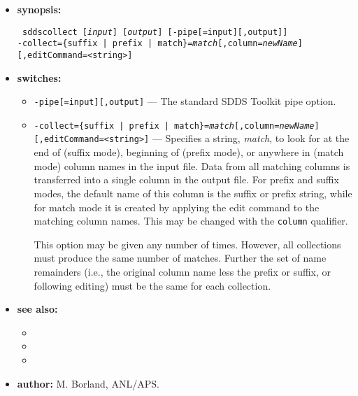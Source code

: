 \begin{itemize}
\item {\bf synopsis:}  
 
\begin{flushleft}{\tt 
sddscollect [{\em input}] [{\em output}] [-pipe[=input][,output]] \\
-collect=\{suffix | prefix | match\}={\em match}[,column={\em newName}][,editCommand=<string>] 
}\end{flushleft} 
 
\item {\bf switches:} 
    \begin{itemize} 
    \item {\tt -pipe[=input][,output]} --- The standard SDDS Toolkit pipe option. 
    \item {\tt -collect=\{suffix | prefix | match\}={\em match}[,column={\em newName}][,editCommand=<string>]} 
                --- Specifies 
    a string, {\em match}, to look for at the end of (suffix mode),  
    beginning of (prefix mode), or anywhere in (match mode) column names in the input file. 
    Data from all matching columns is transferred into a single column 
    in the output file.  For prefix and suffix modes, the default name of this column is the 
    suffix or prefix string, while for match mode it is created by applying the edit command
    to the matching column names. This may be changed with the  {\tt column} qualifier. 
 
    This option may be given any number of times. However, all  
    collections must produce the same number of matches.  Further 
    the set of name remainders (i.e., the original 
    column name less the prefix or suffix, or following editing) must  
    be the same for each collection. 
    \end{itemize} 
\item {\bf see also:} 
    \begin{itemize} 
    \item {} 
    \item {} 
    \item {}
    \end{itemize} 
\item {\bf author:} M. Borland, ANL/APS. 
\end{itemize} 
